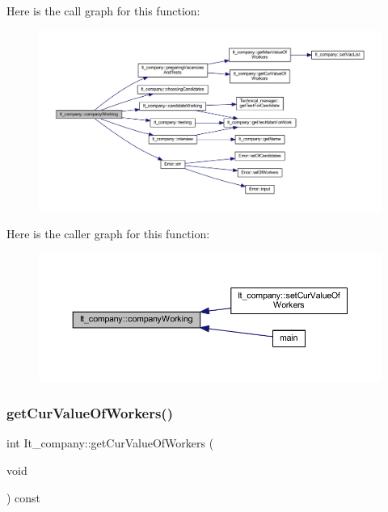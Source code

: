 Here is the call graph for this function\+:
\nopagebreak
\begin{figure}[H]
\begin{center}
\leavevmode
\includegraphics[width=350pt]{class_it__company_a57d8e8056fb6753cef0a6acd80a801dd_cgraph}
\end{center}
\end{figure}
Here is the caller graph for this function\+:
\nopagebreak
\begin{figure}[H]
\begin{center}
\leavevmode
\includegraphics[width=350pt]{class_it__company_a57d8e8056fb6753cef0a6acd80a801dd_icgraph}
\end{center}
\end{figure}
\hypertarget{class_it__company_aadb84a911a10ad83f6e9a84558a1d4df}{}\label{class_it__company_aadb84a911a10ad83f6e9a84558a1d4df} 
\subsubsection{\texorpdfstring{get\+Cur\+Value\+Of\+Workers()}{getCurValueOfWorkers()}}
{\footnotesize\ttfamily int It\+\_\+company\+::get\+Cur\+Value\+Of\+Workers (\begin{DoxyParamCaption}\item[{void}]{ }\end{DoxyParamCaption}) const\hspace{0.3cm}{\ttfamily [inline]}}

